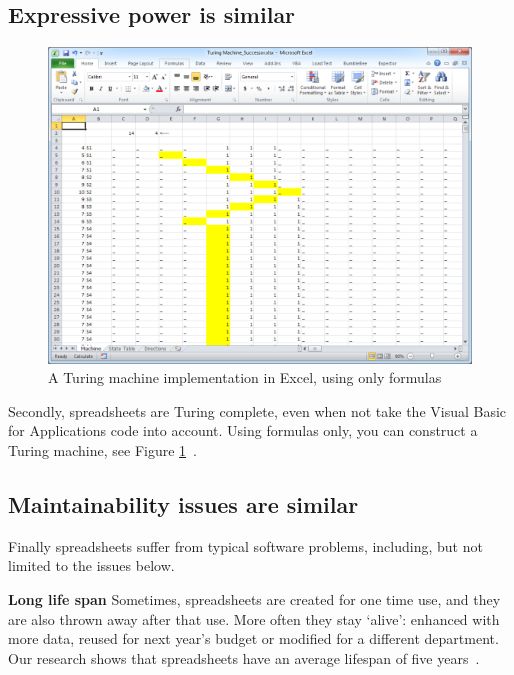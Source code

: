 \documentclass[conference]{IEEEtran}
\begin{document}
\subsection{Expressive power is similar}

\begin{figure}
  \begin{center}
  \includegraphics[width=\columnwidth]{fig/turing.png}
  \caption{A Turing machine implementation in Excel, using only formulas}
  \label{fig:visical}
  \end{center}
\end{figure} 

Secondly, spreadsheets are Turing complete, even when not take the Visual Basic for Applications code into account. Using formulas only, you can construct a Turing machine, see Figure \ref{fig:visical}~\cite{Turing2013}. 

\subsection{Maintainability issues are similar}

Finally spreadsheets suffer from typical software problems, including, but not limited to the issues below.

\textbf{Long life span} Sometimes, spreadsheets are created for one time use, and they are also thrown away after that use. More often they stay ‘alive’: enhanced with more data, reused for next year's budget or modified for a different department. Our research shows that spreadsheets have an average lifespan of five years~\cite{hermans_supporting_2011}.
\end{document}
